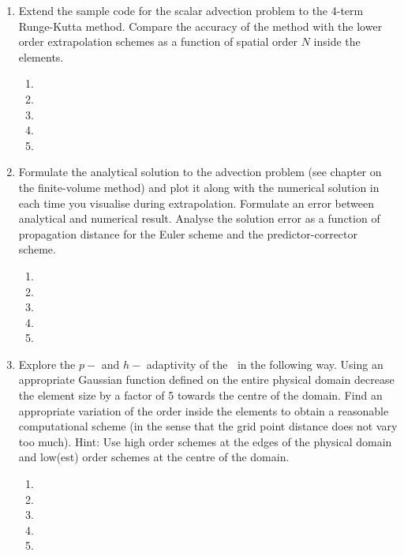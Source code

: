 \begin{enumerate}
\begin{enumerate}
\item[]
\item[] 
\item[]
\item[] 
\end{enumerate}
\item
Extend the sample code for the scalar advection problem to the 4-term Runge-Kutta method. Compare the accuracy of the method with the lower order extrapolation schemes as a function of spatial order $N$ inside the elements. 
\begin{enumerate}
\item[]
\item[]
\item[] 
\item[]
\item[] 
\end{enumerate}
\item
Formulate the analytical solution to the advection problem (see chapter on the finite-volume method) and plot it along with the numerical solution in each time you visualise during extrapolation. Formulate an error between analytical and numerical result. Analyse the solution error as a function of propagation distance for the Euler scheme and the predictor-corrector scheme.
\begin{enumerate}
\item[]
\item[]
\item[] 
\item[]
\item[] 
\end{enumerate}
\item
Explore the $p-$ and $h-$ adaptivity of the \dGs $\ $ in the following way. Using an appropriate Gaussian function defined on the entire physical domain decrease the element size by a factor of 5 towards the centre of the domain. Find an appropriate variation of the order inside the elements to obtain a reasonable computational scheme (in the sense that the grid point distance does not vary too much). Hint: Use high order schemes at the edges of the physical domain and low(est) order schemes at the centre of the domain.   
\begin{enumerate}
\item[]
\item[]
\item[] 
\item[]
\item[] 
\end{enumerate}
\end{enumerate}